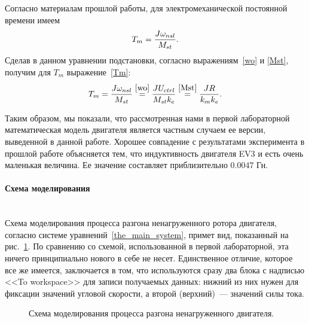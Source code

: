 \documentclass[12pt, a4paper, openany]{extarticle}
\begin{document}
Согласно материалам прошлой работы, для электромеханической постоянной времени имеем
\begin{equation}
	T_m = \frac{J\omega_{nsl}}{M_{st}}\ldotp
\end{equation}
Сделав в данном уравнении подстановки, согласно выражениям~\eqref{wo} и \eqref{Mst}, получим для $T_m$ выражение~\eqref{Tm}:
\begin{equation}
	T_m = \frac{J\omega_{nsl}}{M_{st}} \stackrel{\eqref{wo}}{=} \frac{JU_{ctrl}}{M_{st}k_e} \stackrel{\eqref{Mst}}{=}
	\frac{JR}{k_mk_e}\ldotp
\end{equation}

Таким образом, мы показали, что рассмотренная нами в первой лабораторной математическая модель двигателя является частным случаем ее версии, выведенной в данной работе.
Хорошее совпадение с результатами эксперимента в прошлой работе объясняется тем, что индуктивность двигателя EV3 и есть очень маленькая величина.
Ее значение составляет приблизительно $\text{0.0047 Гн}$.

\paragraph*{Схема моделирования}$\phantom{-}$\\
\hspace*{\parindent}Схема моделирования процесса разгона ненагруженного ротора двигателя, согласно системе уравнений~\eqref{the_main_system}, примет вид, показанный на рис.~\ref{struct_sheme}.
По сравнению со схемой, использованной в первой лабораторной, эта ничего принципиально нового в себе не несет. 
Единственное отличие, которое все же имеется, заключается в том, что используются сразу два блока с надписью <<To workspace>> для записи получаемых данных: нижний из них нужен для фиксации значений угловой скорости, а второй (верхний)~--- значений силы тока. 

\begin{figure}[h]
	\noindent{}
	\caption{Схема моделирования процесса разгона ненагруженного двигателя.}
	\label{struct_sheme}
\end{figure}
\end{document}
